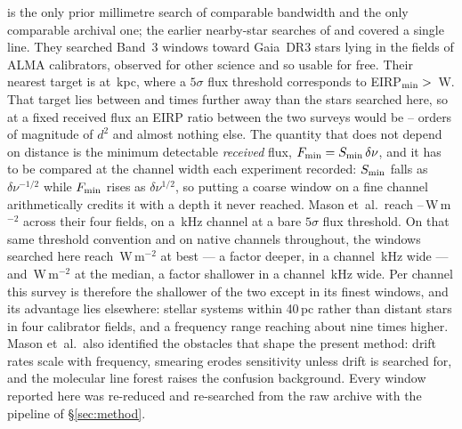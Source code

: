\citet{Mason2025} is the only prior millimetre search of comparable bandwidth
and the only comparable archival one; the earlier nearby-star searches of
\citet{Steffes1994} and \citet{Mauersberger1996} covered a single line. They searched Band~3 windows toward
\MasonNStar{} Gaia~DR3 stars lying in the fields of \MasonNCal{} ALMA
calibrators, observed for other science and so usable for free. Their
nearest target is at \MasonNearKpc\,kpc, where a $5\sigma$ flux threshold
corresponds to EIRP$_{\rm min}>{}$\MasonNearEirp\,W. That target lies
between \MasonDistRatioFar{} and \MasonDistRatioNear{} times further away
than the stars searched here, so at a fixed received flux an EIRP ratio
between the two surveys would be
\MasonEirpOrdLo--\MasonEirpOrdHi{} orders of magnitude of $d^{2}$ and
almost nothing else. The quantity
that does not depend on distance is the minimum detectable \emph{received}
flux, $F_{\rm min}=S_{\rm min}\,\delta\nu$, and it has to be compared at
the channel width each experiment recorded: $S_{\rm min}$ falls as
$\delta\nu^{-1/2}$ while $F_{\rm min}$ rises as $\delta\nu^{1/2}$, so
putting a coarse window on a fine channel arithmetically credits it with a
depth it never reached. Mason
et~al.\ reach \MasonFluxLo--\MasonFluxHi\,W\,m$^{-2}$ across their four
fields, on a \MasonChanKHz\,kHz channel at a bare $5\sigma$ flux
threshold. On that same threshold convention and on native channels
throughout, the windows searched here reach \FluxTrigBest\,W\,m$^{-2}$ at
best --- a factor \FluxNatBestRatio{} deeper, in a channel
\FluxChanBestKHz\,kHz wide --- and \FluxTrigMed\,W\,m$^{-2}$ at the
median, a factor \FluxNatMedRatio{} shallower in a channel
\FluxChanMedKHz\,kHz wide. Per channel this survey is therefore the
shallower of the two except in its finest windows, and its advantage lies
elsewhere: \NSysClassA{} stellar systems within 40\,pc rather than distant
stars in four calibrator fields, and a frequency range reaching about nine
times higher. Mason et~al.\ also
identified the obstacles that shape the present method: drift rates scale
with frequency, smearing erodes sensitivity unless drift is searched for,
and the molecular line forest raises the confusion background. Every
window reported here was re-reduced and re-searched from the raw archive
with the pipeline of \S\ref{sec:method}.

